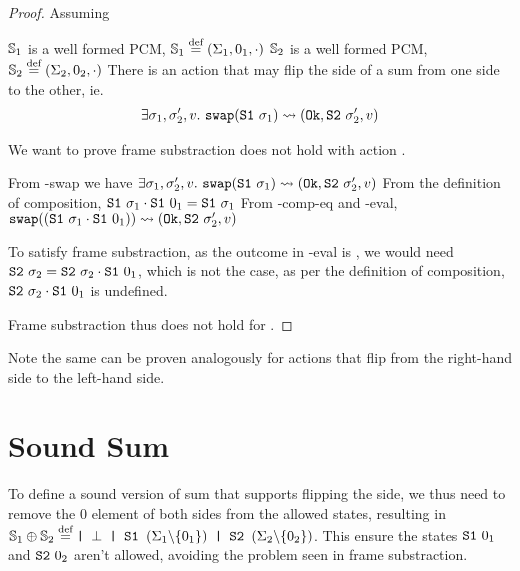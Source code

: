 \begin{proof}


Assuming 
\begin{hypvlist}
 $\mathbb S_1$ is a well formed PCM, $\mathbb S_1 \stackrel{\textnormal{def}}= (\Sigma_1, 0_1, \cdot)$
 $\mathbb S_2$ is a well formed PCM, $\mathbb S_2 \stackrel{\textnormal{def}}= (\Sigma_2, 0_2, \cdot)$
 There is an action \swap{} that may flip the side of a sum from one side to the other, ie.
	\begin{align*}
		\exists \sigma_1,\sigma_2',v.~ \texttt{swap}(\texttt{S1}~\sigma_1)\rightsquigarrow(\texttt{Ok},\texttt{S2}~\sigma_2',v)
	\end{align*}

\end{hypvlist}
	
We want to prove frame substraction does not hold with action \swap.

\begin{hypvlist}
	 From \hyp{swap} we have $\exists \sigma_1,\sigma_2',v.~ \texttt{swap}(\texttt{S1}~\sigma_1)\rightsquigarrow(\texttt{Ok},\texttt{S2}~\sigma_2',v)$
	 From the definition of composition, $\texttt{S1}~\sigma_1\cdot\texttt{S1}~0_1=\texttt{S1}~\sigma_1$
	 From \hyp{comp-eq} and \hyp{eval}, $\texttt{swap}((\texttt{S1}~\sigma_1\cdot\texttt{S1}~0_1))\rightsquigarrow(\texttt{Ok},\texttt{S2}~\sigma_2',v)$
\end{hypvlist}
	
To satisfy frame substraction, as the outcome in \hyp{eval} is \Ok, we would need $\texttt{S2}~\sigma_2 = \texttt{S2}~\sigma_2 \cdot \texttt{S1}~0_1$, which is not the case, as per the definition of composition, $\texttt{S2}~\sigma_2 \cdot \texttt{S1}~0_1$ is undefined.

Frame substraction thus does not hold for \swap.
\end{proof}

Note the same can be proven analogously for actions that flip from the right-hand side to the left-hand side.

\section{Sound Sum}

To define a sound version of sum that supports flipping the side, we thus need to remove the $0$ element of both sides from the allowed states, resulting in $\mathbb S_1 \oplus \mathbb S_2 \stackrel{\textnormal{def}}= \texttt{| }\bot \texttt{ | S1 } (\Sigma_1 \backslash \{ 0_1\}) \texttt{ | S2 } (\Sigma_2 \backslash \{0_2\})$. This ensure the states $\texttt{S1}~0_1$ and $\texttt{S2}~0_2$ aren't allowed, avoiding the problem seen in frame substraction. 

